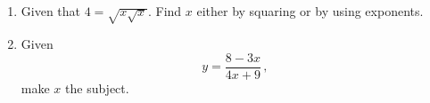 \documentclass[12pt,a4paper]{article}
\begin{document}
\begin{enumerate}
\begin{center}

\end{center}

\begin{enumerate}

    \item Calculate the area of the square.

    \vspace{0.5cm}

    \item Calculate the area of the bullseye.

    \vspace{1cm}

    \item Hence, calculate the probability that Gerald hits the bullseye. Give your answer as a percentage to 2 decimal places.

    \vspace{2cm}
[\textit{hint: the probability is the ratio of the area of the bullseye to the area of the square.}]

\end{enumerate}

    \vspace{3cm}

    \item Given that 
    $4 = \sqrt{x\sqrt{x}}$. Find $x$ either by squaring or by using exponents. 

    \vspace{3cm}

    \item Given 
    \begin{equation*}
        y = \frac{8 - 3x}{4x + 9} \, ,
    \end{equation*}
    make $x$ the subject.
    
    \vspace{3cm}


\end{enumerate}
\end{document}
